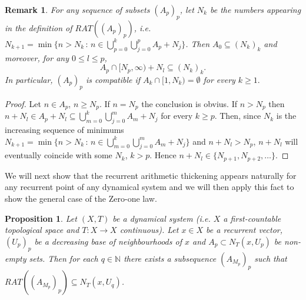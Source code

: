 \documentclass[11pt]{amsart}
\newtheorem{proposition}[theorem]{Proposition}
\newtheorem{remark}[theorem]{Remark}
\newcommand{\zN}{\mathbb N}
\newcommand{\sub}{\subseteq}
\begin{document}




\begin{remark}\label{rem:A_0 contenido en RAT}
    For any sequence of subsets $(A_p)_p$, let $N_k$ be the numbers appearing in the definition of $RAT((A_p)_p)$, i.e. $N_{k+1}=\min\{ n>N_{k}\,:\, n\in\bigcup_{p=0}^{k}\bigcup_{j=0}^p A_{p}+N_j\}$. Then $A_0\sub (N_k)_k$ and moreover, for any $0\le l\le p$,
    $$
    A_p\cap [N_p,\infty)+N_l\sub (N_k)_k.
    $$
    In particular, $(A_p)_p$ is compatible if $A_k\cap [1,N_k)=\emptyset$ for every $k\ge1.$
\end{remark}
\begin{proof}
Let $n\in A_p$, $n\ge N_p$. If $n=N_p$ the conclusion is obvius. If $n>N_p$ then $n+N_l\in A_p+N_l\subseteq  \bigcup_{m=0}^{k}\bigcup_{j=0}^m A_{m}+N_j$ for every $k\ge p$.  Then, since $N_k$ is the increasing sequence of minimums $N_{k+1}=\min\{ n>N_{k}\,:\, n\in\bigcup_{m=0}^{k}\bigcup_{j=0}^m A_{m}+N_j\}$ and $n+N_l> N_p$, $n+N_l$ will eventually coincide with some $N_{k}$, $k>p$.  Hence $n+N_l\in \{N_{p+1},N_{p+2},\dots\}$. 
\end{proof}



We will next show that the recurrent arithmetic thickening appears naturally for any recurrent point of any dynamical system and we will then apply this fact to show the general case of the Zero-one law.
\begin{proposition}\label{prop: condic necesaria vectores recurrentes}
    Let $(X,T)$ be a dynamical system (i.e. $X$ a first-countable topological space and $T:X\to X$  continuous). Let $x\in X$ be a recurrent vector, $(U_p)_p$ be a decreasing base of neighbourhoods of $x$ and $A_p\subset N_T(x,U_p)$ be non-empty sets. Then for each $q\in \zN$ there exists a subsequence $(A_{M_p})_p$ such that 
       $RAT((A_{M_p})_p)\subseteq N_T(x,U_q)$. 
\end{proposition}
\end{document}
